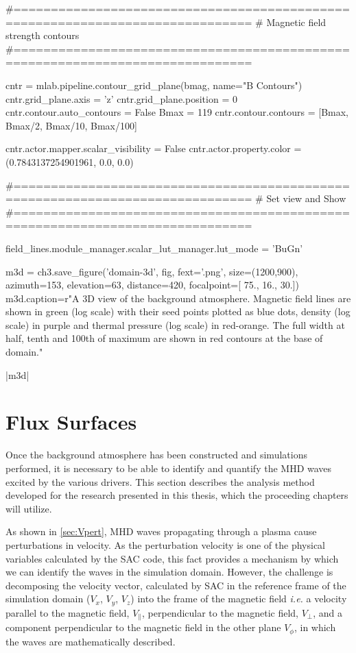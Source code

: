 \begin{pycode}[chapter3a]
#==============================================================================
# Magnetic field strength contours
#==============================================================================

cntr = mlab.pipeline.contour_grid_plane(bmag, name="B Contours")
cntr.grid_plane.axis = 'z'
cntr.grid_plane.position = 0
cntr.contour.auto_contours = False
Bmax = 119
cntr.contour.contours = [Bmax, Bmax/2, Bmax/10, Bmax/100]

cntr.actor.mapper.scalar_visibility = False
cntr.actor.property.color = (0.7843137254901961, 0.0, 0.0)

#==============================================================================
# Set view and Show
#==============================================================================

field_lines.module_manager.scalar_lut_manager.lut_mode = 'BuGn'

m3d = ch3.save_figure('domain-3d', fig, fext='.png', size=(1200,900),
                      azimuth=153, elevation=63, distance=420,
                      focalpoint=[ 75.,  16.,  30.])
m3d.caption=r"A 3D view of the background atmosphere. Magnetic field lines are shown in green (log scale) with their seed points plotted as blue dots, density (log scale) in purple and thermal pressure (log scale) in red-orange. The full width at half, tenth and 100th of maximum are shown in red contours at the base of domain."

\end{pycode}

\py[chapter3a]|m3d|

\section{Flux Surfaces}\label{sec:fluxsurfaces}

Once the background atmosphere has been constructed and simulations performed, it is necessary to be able to identify and quantify the MHD waves excited by the various drivers.
This section describes the analysis method developed for the research presented in this thesis, which the proceeding chapters will utilize.

As shown in \cref{sec:Vpert}, MHD waves propagating through a plasma cause perturbations in velocity.
As the perturbation velocity is one of the physical variables calculated by the SAC code, this fact provides a mechanism by which we can identify the waves in the simulation domain.
However, the challenge is decomposing the velocity vector, calculated by SAC in the reference frame of the simulation domain ($V_x$, $V_y$, $V_z$) into the frame of the magnetic field \textit{i.e.} a velocity parallel to the magnetic field, $V_\parallel$, perpendicular to the magnetic field, $V_\perp$, and a component perpendicular to the magnetic field in the other plane $V_\phi$, in which the waves are mathematically described.

